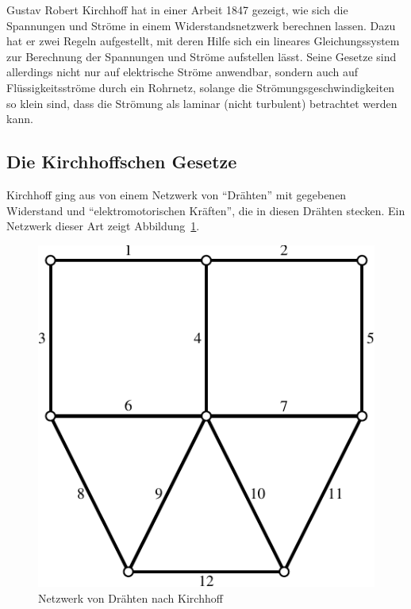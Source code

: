 %
%
Gustav Robert Kirchhoff hat in einer Arbeit 1847 gezeigt, wie sich
die Spannungen und Ströme in einem Widerstandsnetzwerk berechnen
lassen. Dazu hat er zwei Regeln aufgestellt, mit deren Hilfe
sich ein lineares Gleichungssystem zur Berechnung der Spannungen
und Ströme aufstellen lässt.
Seine Gesetze sind allerdings
nicht nur auf elektrische Ströme anwendbar, sondern auch auf
Flüssigkeitsströme durch ein Rohrnetz, solange die
Strömungsgeschwindigkeiten so klein sind, dass die Strömung als
laminar (nicht turbulent) betrachtet werden kann.

\subsection{Die Kirchhoffschen Gesetze\label{appkirchhoff}}
Kirchhoff ging aus von einem Netzwerk von ``Drähten'' mit gegebenen
Widerstand und ``elektromotorischen Kräften'', die in diesen
Drähten stecken. Ein Netzwerk dieser Art zeigt
Abbildung~\ref{kirchhoff-netzwerk}.
\begin{figure}
\begin{center}
\includegraphics[width=0.6\hsize]{images/kirchhoff-1}
\end{center}
\caption{Netzwerk von Drähten nach Kirchhoff\label{kirchhoff-netzwerk}}
\end{figure}

